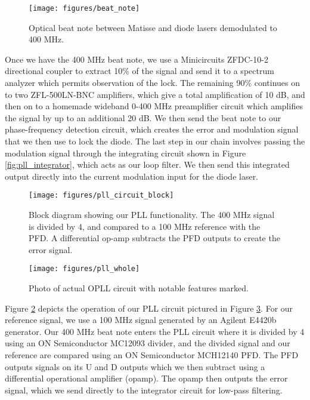 \begin{figure}[!ht] 
 \centering 
 \texttt{[image: figures/beat\_note]} 
 \caption[Optical PLL beat note demodulated to 400 MHz]{Optical beat note between Matisse and diode lasers demodulated to 400 MHz.} 
 \label{fig:beat_note}
\end{figure}

Once we have the 400 MHz beat note, we use a Minicircuits ZFDC-10-2
directional coupler to extract 10\% of the signal and send it to a spectrum
analyzer which permits observation of the lock. The remaining 90\% continues
on to two ZFL-500LN-BNC amplifiers, which give a total amplification of 10 dB,
and then on to a homemade wideband 0-400 MHz preamplifier circuit which
amplifies the signal by up to an additional 20 dB.  We then send the beat note to our
phase-frequency detection circuit, which creates the error and modulation
signal that we then use to lock the diode.  The last step in our chain
involves passing the modulation signal through the integrating circuit shown
in Figure \ref{fig:pll_integrator}, which acts as our loop filter.  We then send this integrated output directly into the current modulation input for the diode laser.


\begin{figure}[!ht] 
 \centering 
 \texttt{[image: figures/pll\_circuit\_block]} 
 \caption[PLL circuit block diagram]{Block diagram showing our PLL functionality.  The 400 MHz signal is divided by 4, and compared to a 100 MHz reference with the PFD.  A differential op-amp subtracts the PFD outputs to create the error signal.} 
 \label{fig:pll_circuit_block} 
\end{figure}

\begin{figure}[!ht] 
 \centering 
 \texttt{[image: figures/pll\_whole]} 
 \caption[PLL circuit photo]{Photo of actual OPLL circuit with notable features marked.} 
 \label{fig:pll_whole} 
\end{figure}

 
Figure \ref{fig:pll_circuit_block} depicts the operation of our PLL circuit pictured in Figure \ref{fig:pll_whole}.  For our reference signal, we use a 100 MHz signal generated by an Agilent 
E4420b generator.  Our 400 MHz beat note enters the PLL circuit where it is
divided by 4 using an ON Semiconductor MC12093 divider, and the divided signal
and our reference are compared using an ON Semiconductor MCH12140 PFD.  The
PFD outputs signals on its U and D outputs which we then subtract using a
differential operational amplifier (opamp).  The opamp then outputs the error signal, which we send
directly to the integrator circuit for low-pass filtering.

